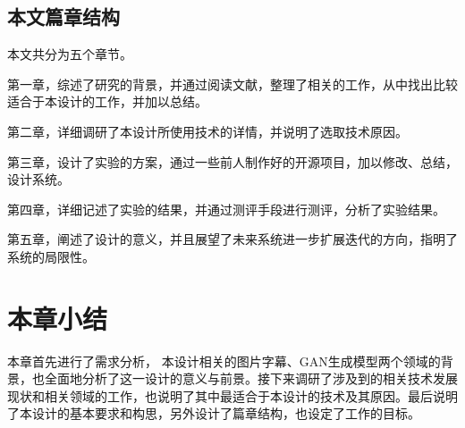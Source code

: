 \subsection{本文篇章结构}

本文共分为五个章节。

第一章，综述了研究的背景，并通过阅读文献，整理了相关的工作，从中找出比较适合于本设计的工作，并加以总结。

第二章，详细调研了本设计所使用技术的详情，并说明了选取技术原因。

第三章，设计了实验的方案，通过一些前人制作好的开源项目，加以修改、总结，设计系统。

第四章，详细记述了实验的结果，并通过测评手段进行测评，分析了实验结果。

第五章，阐述了设计的意义，并且展望了未来系统进一步扩展迭代的方向，指明了系统的局限性。

\section{本章小结}
本章首先进行了需求分析，
本设计相关的图片字幕、GAN生成模型两个领域的背景，也全面地分析了这一设计的意义与前景。接下来调研了涉及到的相关技术发展现状和相关领域的工作，也说明了其中最适合于本设计的技术及其原因。最后说明了本设计的基本要求和构思，另外设计了篇章结构，也设定了工作的目标。
